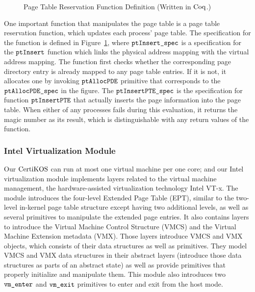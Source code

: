 \begin{figure}
 
\caption{Page Table Reservation Function Definition (Written in $\mathrm{Coq}$.)}
\label{fig:chapter:certikos:ptresv-func}
\end{figure}
 One important function that manipulates the page table is a page table reservation function,
 which updates each process' page table.
 The specification for the function is defined in Figure~\ref{fig:chapter:certikos:ptresv-func},
  where  ${\mathrm{\texttt{ptInsert\_spec}}}$ is a specification for the ${\mathrm{\texttt{ptInsert}}}$ function which links 
the physical address mapping with the virtual address mapping. 
The function first checks whether the corresponding page directory entry is already mapped to any page table entries.
If it is not, it allocates one by invoking ${\mathrm{\texttt{ptAllocPDE}}}$ primitive that corresponds to the  ${\mathrm{\texttt{ptAllocPDE\_spec}}}$
in the figure.
The ${\mathrm{\texttt{ptInsertPTE\_spec}}}$ is the specification for function ${\mathrm{\texttt{ptInsertPTE}}}$ that actually inserts the page 
information into the page table. 
When either of any processes fails during this evaluation, it returns the magic number as its result, which is distinguishable with 
any return values of the function.

\subsubsection{Intel Virtualization Module}


Our $\mathrm{CertiKOS}$ can run at most one virtual machine per one core;
and our Intel virtualization module implements layers related to the virtual machine management,
the hardware-assisted virtualization technology Intel VT-x.  
The module introduces the four-level Extended Page Table (EPT), 
similar to the two-level in-kernel page table structure except having  two additional levels, 
as well as several primitives to manipulate the extended page entries.
It also contains layers to introduce the Virtual Machine Control Structure (VMCS) and the
 Virtual Machine Extension metadata (VMX).
Those layers introduce VMCS and VMX objects, which consists of their data structures as well as primitives. 
They model VMCS and VMX data structures  in their 
 abstract layers (introduce those data structures as parts of an abstract state)
as well as provide primitives that properly initialize and manipulate them. 
This module also introduces two ${\mathrm{\texttt{vm\_enter}}}$ and ${\mathrm{\texttt{vm\_exit}}}$ primitives to enter and exit from the host mode.


